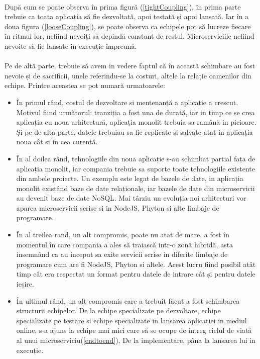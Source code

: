 \documentclass[12pt]{report}
\begin{document}
  	\paragraph{}După cum se poate observa în prima figură (\ref{tightCoupling}), în prima parte trebuie ca toata aplicația să fie dezvoltată, apoi testată și apoi lansată. Iar în a doua figura (\ref{looseCoupling}), se poate observa ca echipele pot să lucreze fiecare în ritmul lor, nefiind nevoiți să depindă constant de restul. Microserviciile nefiind nevoite să fie lansate in execuție împreună.
	\paragraph{}Pe de altă parte, trebuie să avem in vedere faptul că în această schimbare au fost nevoie și de sacrificii, unele referindu-se la costuri, altele la relație oamenilor din echipe. Printre aceastea se pot numară urmatoarele:
  	\begin{itemize}
  	\item În primul rând, costul de dezvoltare si mentenanță a aplicație a crescut. Motivul fiind următorul: tranziția a fost una de durată, iar in timp ce se crea aplicația cu noua arhitectură, aplicația monolit trebuia sa ramână in picioare. Și pe de alta parte, datele trebuiau sa fie replicate si salvate atat in aplicația noua cât si in cea curentă.
  	\item În al doilea rând, tehnologiile din noua aplicație s-au schimbat partial fața de aplicația monolit, iar compania trebuie sa suporte toate tehnologiile existente din ambele proiecte. Un exemplu este legat de bazele de date, in aplicația monolit existând baze de date relaționale, iar bazele de date din microservicii au devenit baze de date NoSQL. Mai târziu un evoluția noi arhitecturi vor aparea microservicii scrise si in NodeJS, Phyton si alte limbaje de programare.
    \item În al treilea rand, un alt compromis, poate nu atat de mare, a fost în momentul în care compania a ales să traiască intr-o zonă hibridă, asta insemnând ca au inceput sa exite servicii scrise in diferite limbaje de programare cum are fi NodeJS, Phyton si altele. Acest lucru fiind posibil atât timp cât era respectat un format pentru datele de intrare cât și pentru datele ieșire.
  	\item În ultimul rând, un alt compromis care a trebuit făcut a fost schimbarea structurii echipelor. De la echipe specializate pe dezvoltare, echipe specializate pe testare si echipe specializate in lansarea aplicației in mediul online, s-a ajuns la echipe mai mici care să se ocupe de intreg ciclul de viată al unui microserviciu(\ref{endtoend}), De la implementare, pâna la lansarea lui in execuție.
  	\end{itemize}
\end{document}
